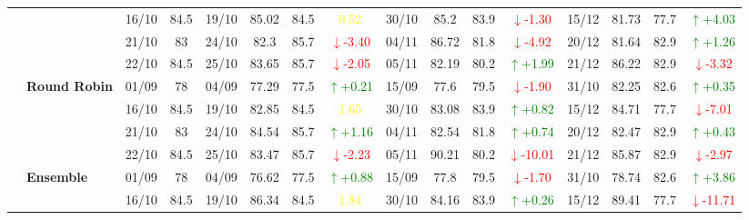 \documentclass{ieeeaccess}
\begin{document}
{\begin{longtable}{llcc|cccc|cccc|cccc}
&
& 16/10 & 84.5 & 19/10 & 85.02 & 84.5 & \textcolor{yellow}{0.52} & 30/10 & 85.2 & 83.9 & \textcolor{red}{\(\downarrow\)-1.30} & 15/12 & 81.73 & 77.7 & \textcolor{green}{\(\uparrow\)+4.03} \\

&
& 21/10 & 83 & 24/10 & 82.3 & 85.7 & \textcolor{red}{\(\downarrow\)-3.40} & 04/11 & 86.72 & 81.8 & \textcolor{red}{\(\downarrow\)-4.92} & 20/12 & 81.64 & 82.9 & \textcolor{green}{\(\uparrow\)+1.26} \\

&
& 22/10 & 84.5 & 25/10 & 83.65 & 85.7 & \textcolor{red}{\(\downarrow\)-2.05} & 05/11 & 82.19 & 80.2 & \textcolor{green}{\(\uparrow\)+1.99} & 21/12 & 86.22 & 82.9 & \textcolor{red}{\(\downarrow\)-3.32} \\
\cmidrule(lr){2-16}


& \textbf{Round Robin}
& 01/09 & 78 & 04/09 & 77.29 & 77.5 & \textcolor{green}{\(\uparrow\)+0.21} & 15/09 & 77.6 & 79.5 & \textcolor{red}{\(\downarrow\)-1.90} & 31/10 & 82.25 & 82.6 & \textcolor{green}{\(\uparrow\)+0.35} \\

&
& 16/10 & 84.5 & 19/10 & 82.85 & 84.5 & \textcolor{yellow}{1.65} & 30/10 & 83.08 & 83.9 & \textcolor{green}{\(\uparrow\)+0.82} & 15/12 & 84.71 & 77.7 & \textcolor{red}{\(\downarrow\)-7.01} \\

&
& 21/10 & 83 & 24/10 & 84.54 & 85.7 & \textcolor{green}{\(\uparrow\)+1.16} & 04/11 & 82.54 & 81.8 & \textcolor{green}{\(\uparrow\)+0.74} & 20/12 & 82.47 & 82.9 & \textcolor{green}{\(\uparrow\)+0.43} \\

&
& 22/10 & 84.5 & 25/10 & 83.47 & 85.7 & \textcolor{red}{\(\downarrow\)-2.23} & 05/11 & 90.21 & 80.2 & \textcolor{red}{\(\downarrow\)-10.01} & 21/12 & 85.87 & 82.9 & \textcolor{red}{\(\downarrow\)-2.97} \\
\cmidrule(lr){2-16}




& \textbf{Ensemble}
& 01/09 & 78 & 04/09 & 76.62 & 77.5 & \textcolor{green}{\(\uparrow\)+0.88} & 15/09 & 77.8 & 79.5 & \textcolor{red}{\(\downarrow\)-1.70} & 31/10 & 78.74 & 82.6 & \textcolor{green}{\(\uparrow\)+3.86} \\

&
& 16/10 & 84.5 & 19/10 & 86.34 & 84.5 & \textcolor{yellow}{1.84} & 30/10 & 84.16 & 83.9 & \textcolor{green}{\(\uparrow\)+0.26} & 15/12 & 89.41 & 77.7 & \textcolor{red}{\(\downarrow\)-11.71} \\


\end{longtable}}
\end{document}
